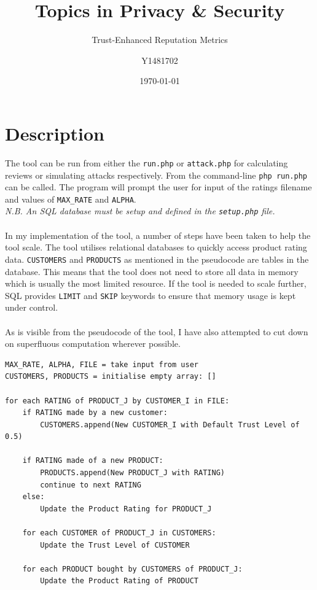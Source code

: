 \documentclass{article}
\title{Topics in Privacy \& Security}
\subtitle{Trust-Enhanced Reputation Metrics}
\author{Y1481702}
\date{\today}
\begin{document}
\begin{titlepage}
\clearpage
\maketitle
\thispagestyle{empty}
\tableofcontents
\end{titlepage}



\section{Description} %
The tool can be run from either the \texttt{run.php} or \texttt{attack.php} for calculating reviews or simulating attacks respectively. From the command-line \texttt{php run.php} can be called. The program will prompt the user for input of the ratings filename and values of \texttt{MAX\_RATE} and \texttt{ALPHA}.
\\
\textit{N.B. An SQL database must be setup and defined in the \texttt{setup.php} file.}
\\\\
In my implementation of the tool, a number of steps have been taken to help the tool scale.
The tool utilises relational databases to quickly access product rating data. \texttt{CUSTOMERS} and \texttt{PRODUCTS} as mentioned in the pseudocode are tables in the database. This means that the tool does not need to store all data in memory which is usually the most limited resource.
If the tool is needed to scale further, SQL provides \texttt{LIMIT} and \texttt{SKIP} keywords to ensure that memory usage is kept under control.
\\\\
As is visible from the pseudocode of the tool, I have also attempted to cut down on superfluous computation wherever possible.
\begin{lstlisting}
MAX_RATE, ALPHA, FILE = take input from user
CUSTOMERS, PRODUCTS = initialise empty array: []

for each RATING of PRODUCT_J by CUSTOMER_I in FILE:
	if RATING made by a new customer:
		CUSTOMERS.append(New CUSTOMER_I with Default Trust Level of 0.5)

	if RATING made of a new PRODUCT:
		PRODUCTS.append(New PRODUCT_J with RATING)
		continue to next RATING
	else:
		Update the Product Rating for PRODUCT_J

	for each CUSTOMER of PRODUCT_J in CUSTOMERS:
		Update the Trust Level of CUSTOMER

	for each PRODUCT bought by CUSTOMERS of PRODUCT_J:
		Update the Product Rating of PRODUCT

\end{lstlisting}
\end{document}
